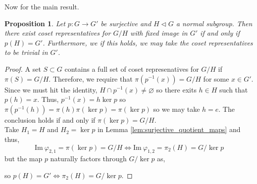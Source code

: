 \documentclass{article}
\renewcommand{\Im}{\mathrm{Im} \: }
\newtheorem{proposition}[theorem]{Proposition}
\theoremstyle{definition}
\theoremstyle{definition}
\theoremstyle{remark}
\begin{document}
Now for the main result.

\begin{proposition}
Let $p : G \to G'$ be surjective and $H \triangleleft G$ a normal subgroup. Then there exist coset representatives for $G/H$ with fixed image in $G'$ if and only if $p(H) = G'$. Furthermore, we if this holds, we may take the coset representatives to be trivial in $G'$. 
\end{proposition}

\begin{proof}
A set $S \subset G$ contains a full set of coset represenatives for $G/H$ if $\pi(S) = G/H$. Therefore, we require that $\pi(p^{-1}(x)) = G/H$ for some $x \in G'$. Since we must hit the identity, $H \cap p^{-1}(x) \neq \varnothing$ so there exits $h \in H$ such that $p(h) = x$. Thus, $p^{-1}(x) = h \ker{p}$ so $\pi(p^{-1}(h)) = \pi(h) \pi(\ker{p}) = \pi(\ker{p})$ so we may take $h = e$. The conclusion holds if and only if $\pi(\ker{p}) = G/H$. 
\bigskip\\    
Take $H_1 = H$ and $H_2 = \ker{p}$ in Lemma \ref{lem:surjective_quotient_maps} and thus, 
\[\Im{\varphi_{2,1}} = \pi(\ker{p}) = G/H \iff \Im{\varphi_{1,2}} = \pi_2(H) = G/\ker{p} \]
but the map $p$ naturally factors through $G / \ker{p}$ as,
\begin{center}
\end{center}
so $p(H) = G' \iff \pi_2(H) = G / \ker{p}$. 
\end{proof}
\end{document}
